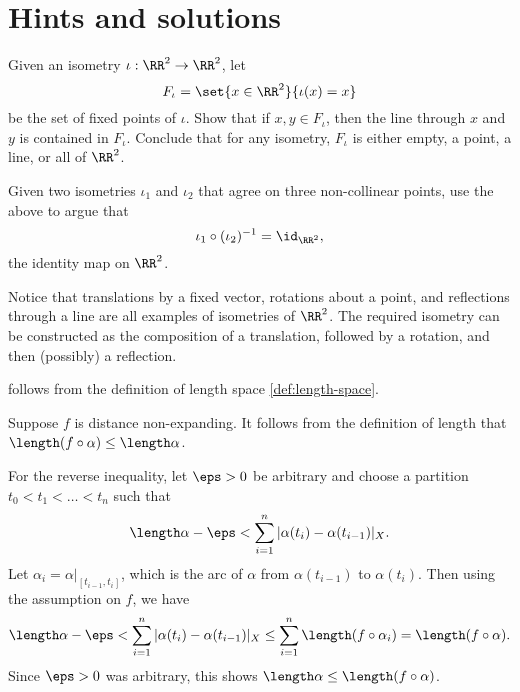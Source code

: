 \section*{Hints and solutions}

Given an isometry $\iota: \RR^2 \to \RR^2$, let
$$F_{\iota} = \set{x \in \RR^2}{\iota(x) = x}$$ be the set of fixed points of $\iota$.  Show that if $x, y \in F_{\iota}$, then the line through $x$ and $y$ is contained in $F_{\iota}$.  Conclude that for any isometry, $F_{\iota}$ is either empty, a point, a line, or all of $\RR^2$.

Given two isometries $\iota_1$ and $\iota_2$ that agree on three non-collinear points, use the above to argue that
$$\iota_1 \circ (\iota_2)^{-1} = \id_{\RR^2},$$ the identity map on $\RR^2$.


Notice that translations by a fixed vector, rotations about a point, and reflections through a line are all examples of isometries of $\RR^2$.  The required isometry can be constructed as the composition of a translation, followed by a rotation, and then (possibly) a reflection.

 follows from the definition of length space \ref{def:length-space}.

\parbf{(\ref{LP=>short:b})}
Suppose $f$ is distance non-expanding.  It follows from the definition of length that $\length (f\circ \alpha) \le \length \alpha$.

For the reverse inequality, let $\eps > 0$ be arbitrary and choose a partition $t_0 < t_1 < \dots < t_n$ such that
$$\length \alpha - \eps < \sum_{i=1}^n |\alpha(t_i) - \alpha(t_{i-1})|_X.$$
Let $\alpha_i = \alpha|_{[t_{i-1}, t_i]}$, which is the arc of $\alpha$ from $\alpha(t_{i-1})$ to $\alpha(t_i)$.  Then using the assumption on $f$, we have
$$\length \alpha - \eps < \sum_{i=1}^n |\alpha(t_i) - \alpha(t_{i-1})|_X \le \sum_{i=1}^n \length(f \circ \alpha_i) = \length(f\circ \alpha).$$  Since $\eps >0$ was arbitrary, this shows $\length \alpha \le \length (f \circ \alpha)$.


